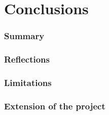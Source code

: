 \chapter{Conclusions}
\subsection{Summary}
\subsection{Reflections}
\subsection{Limitations}
\subsection{Extension of the project}
